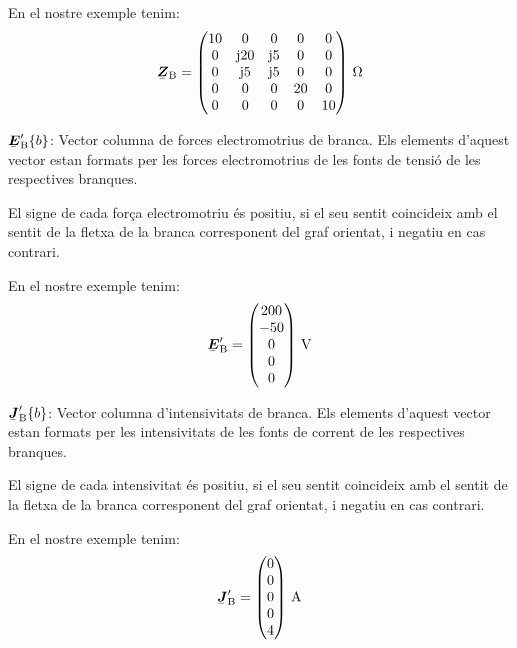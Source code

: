\begin{list}{}
   En el nostre exemple tenim:
   \[
      \mcmplx{Z}\ped{B} = \begin{pmatrix}
            10 & 0 & 0 & 0 & 0 \\
            0 & \ju 20 & \ju 5 & 0 & 0 \\
            0 & \ju 5 & \ju 5 & 0 & 0 \\
            0 & 0 & 0 & 20 & 0 \\
            0 & 0 & 0 & 0 & 10
      \end{pmatrix}\unit{\ohm}
   \]

   \item[$\mcmplx{E}'\ped{B}\{b\}$:] Vector columna de forces electromotrius de branca. Els elements d'aquest vector estan formats per les forces electromotrius de les fonts de tensi\'{o} de les respectives branques.

El signe de cada for\c{c}a electromotriu \'{e}s positiu, si el seu sentit coincideix amb el sentit de la fletxa de la branca corresponent del graf orientat, i negatiu en cas contrari.

   En el nostre exemple tenim:
   \[
      \mcmplx{E}'\ped{B} = \begin{pmatrix} 200 \\ -50 \\ 0 \\ 0 \\ 0 \end{pmatrix}\unit{V}
   \]

   \item[$\mcmplx{J}'\ped{B}\{b\}$:] Vector columna d'intensivitats de branca. Els elements d'aquest vector estan formats per les intensivitats de les fonts de corrent de les respectives branques.

El signe de cada intensivitat \'{e}s positiu, si el seu sentit coincideix amb el sentit de la fletxa de la branca corresponent del graf orientat, i negatiu en cas contrari.

   En el nostre exemple tenim:
   \[
      \mcmplx{J}'\ped{B} = \begin{pmatrix} 0 \\ 0 \\ 0 \\ 0 \\ 4 \end{pmatrix}\unit{A}
   \]

\end{list}

